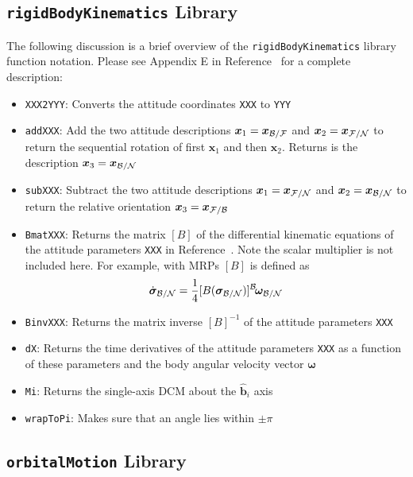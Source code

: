 \subsection{{\tt rigidBodyKinematics} Library}

The following discussion is a brief overview of the {\tt rigidBodyKinematics} library function notation.  Please see Appendix E in Reference~ for a complete description:
\begin{itemize}
	\item {\tt XXX2YYY}: Converts the attitude coordinates {\tt XXX} to {\tt YYY}
	\item {\tt addXXX}: Add the two attitude descriptions $\bm x_{1} = \bm x_{\cal B/F}$ and $\bm x_{2}= \bm x_{\cal F/N}$ to return the sequential rotation of first $\bm x_{1}$ and then $\bm x_{2}$.  Returns is the description $\bm x_{3} = \bm x_{\cal B/N}$
	\item {\tt subXXX}: Subtract the two attitude descriptions $\bm x_{1} = \bm x_{\cal F/N}$ and $\bm x_{2}= \bm x_{\cal B/N}$ to return the relative orientation $\bm x_{3} = \bm x_{\cal F/B}$
	\item {\tt BmatXXX}: Returns the matrix $[B]$ of the differential kinematic equations of the attitude parameters {\tt XXX} in Reference~.  Note the scalar multiplier is not included here.  For example, with MRPs\cite{survey} $[B]$ is defined as $$\dot{\bm \sigma}_{\cal B/N} = \frac{1}{4}[B(\bm\sigma_{\cal B/N})] \leftexp{B}{\bm\omega}_{\cal B/N}$$
	\item {\tt BinvXXX}: Returns the matrix inverse $[B]^{-1}$ of the attitude parameters {\tt XXX}
	\item {\tt dX}: Returns the time derivatives of the attitude parameters {\tt XXX} as a function of these parameters and the body angular velocity vector $\bm \omega$
	\item {\tt Mi}: Returns the single-axis DCM about the $\hat{\bm b}_{i}$ axis
	\item {\tt wrapToPi}: Makes sure that an angle  lies within $\pm\pi$
\end{itemize}




\subsection{{\tt orbitalMotion} Library}

